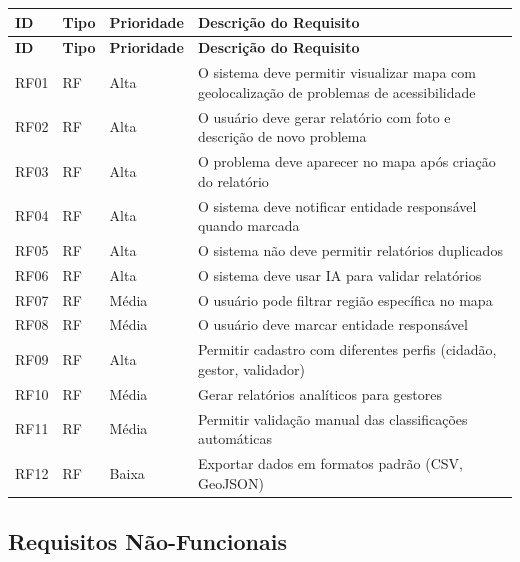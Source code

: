 \documentclass[12pt,a4paper]{article}
\begin{document}
\begin{longtable}{|>{\raggedright\arraybackslash}p{1.2cm}|>{\raggedright\arraybackslash}p{1.1cm}|>{\centering\arraybackslash}p{2.2cm}|>{\raggedright\arraybackslash}p{7.6cm}|}
\hline
\textbf{ID} & \textbf{Tipo} & \textbf{Prioridade} & \textbf{Descrição do Requisito} \\
\hline
\endfirsthead

\hline
\textbf{ID} & \textbf{Tipo} & \textbf{Prioridade} & \textbf{Descrição do Requisito} \\
\hline
\endhead

RF01 & RF & Alta & O sistema deve permitir visualizar mapa com geolocalização de problemas de acessibilidade \\
\hline
RF02 & RF & Alta & O usuário deve gerar relatório com foto e descrição de novo problema \\
\hline
RF03 & RF & Alta & O problema deve aparecer no mapa após criação do relatório \\
\hline
RF04 & RF & Alta & O sistema deve notificar entidade responsável quando marcada \\
\hline
RF05 & RF & Alta & O sistema não deve permitir relatórios duplicados \\
\hline
RF06 & RF & Alta & O sistema deve usar IA para validar relatórios \\
\hline
RF07 & RF & Média & O usuário pode filtrar região específica no mapa \\
\hline
RF08 & RF & Média & O usuário deve marcar entidade responsável \\
\hline
RF09 & RF & Alta & Permitir cadastro com diferentes perfis (cidadão, gestor, validador) \\
\hline
RF10 & RF & Média & Gerar relatórios analíticos para gestores \\
\hline
RF11 & RF & Média & Permitir validação manual das classificações automáticas \\
\hline
RF12 & RF & Baixa & Exportar dados em formatos padrão (CSV, GeoJSON) \\
\hline
\end{longtable}

\subsection{Requisitos Não-Funcionais}
\end{document}
